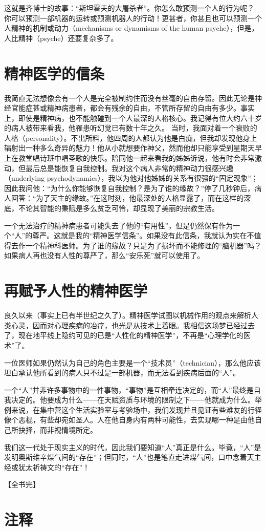 \documentclass[11pt,oneside]{book}
\begin{document}
\begin{common-format}
这就是齐博士的故事：“斯坦霍夫的大屠杀者”。你怎么敢预测一个人的行为呢？ 你可以预测一部机器的运转或预测机器人的行动！更甚者，你甚且也可以预测一个人精神的机制或动力（mechanisms or dynamisms of the human psyche），但是，人比精神（psyche）还要复杂多了。


\section{精神医学的信条}
我简直无法想像会有一个人是完全被制约住而没有丝毫的自由存留。因此无论是神经官能症甚或精神病患者，都会有残余的自由，不管所存留的自由有多少。事实上，即使是精神病，也不能触碰到一个人最深的人格核心。我记得有位大约六十岁的病人被带来看我，他罹患听幻觉已有数十年之久。 当时，我面对着一个衰败的人格（personality）。不出所料，他四周的人都认为他是白痴，但我却发现他身上辐射出一种多么奇异的魅力！他从小就想要作神父，然而他却只能享受到星期天早上在教堂唱诗班中唱圣歌的快乐。陪同他一起来看我的姊姊诉说，他有时会非常激动，但最后总是能恢复自我控制。我对这个病人非常的精神动力很感兴趣（underlying psychodynamics），我以为他对他姊姊的关系有很强的“固定现象”；因此我问他：“为什么你能够恢复自我控制？是为了谁的缘故？”停了几秒钟后，病人回答：“为了天主的缘故。”在这时刻，他最深处的人格显露了，而在这样的深底，不论其智能的秉赋是多么贫乏可怜，却显现了美丽的宗教生活。

一个无法治疗的精神病患者可能失去了他的“有用性”，但是仍然保有作为一个“人”的尊严。这就是我的“精神医学信条”。如果没有此信条，我就认为实在不值得去作一个精神科医师。为了谁的缘故？只是为了损坏而不能修理的“脑机器”吗？如果病人再也没有人性的尊严了，那么“安乐死”就可以使用了。


\section{再赋予人性的精神医学} 
良久以来（事实上已有半世纪之久了）。精神医学试图以机械作用的观点来解析人类心灵，因而对心理疾病的冶疗，也光是从技术上着眼。我相信这场梦已经过去了，现在地平线上隐约可见的已是“人性化的精神医学”，不再是“心理学化的医术”了。

一位医师如果仍然认为自己的角色主要是一个“技术员”（technician），那么他应该坦白承认他所看到的病人只不过是一部机器，而无法看到疾病后面的“人”。

一个“人”并非许多事物中的一件事物，“事物”是互相牵连决定的，而“人”最终是自我决定的。他要成为什么——在天赋资质与环境的限制之下——他就成为什么。举例来说，在集中营这个生活实验室与考验场中，我们发现并且见证有些难友的行径像个恶棍，有些却宛如圣人。人在他自身内有两种可能性，去实现哪一种是由他自己所抉择，而非视情境所定。

我们这一代处于现实主义的时代，因此我们要知道“人”真正是什么。毕竟，“人”是发明奥斯维辛煤气间的“存在”；但同时，“人”也是笔直走进煤气间，口中念着天主经或犹太祈祷文的“存在”！

【全书完】


\section{注释}
\showendnotes



\end{common-format}  
\end{document}
